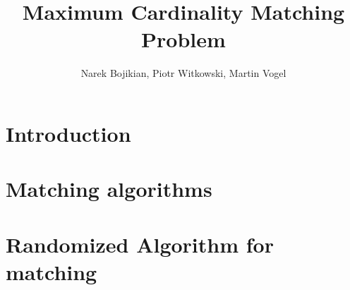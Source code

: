 \documentclass[11pt]{beamer}
\title[Maximum Cardinality Matching]{Maximum Cardinality Matching Problem}
\author [Bojikian, Witkowski, Vogel]{Narek Bojikian, Piotr Witkowski, Martin Vogel}
\begin{document}
\begin{frame}
\titlepage 
\end{frame}

\section{Introduction} 


\section{Matching algorithms} 



\section{Randomized Algorithm for matching} 

\end{document}
